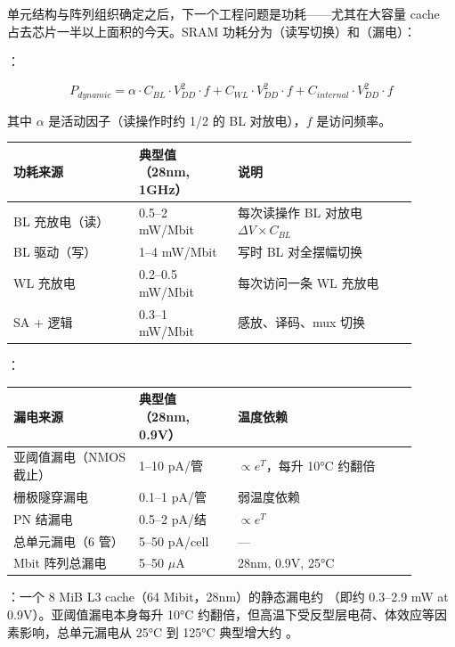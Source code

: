 
单元结构与阵列组织确定之后，下一个工程问题是功耗——尤其在大容量 cache 占去芯片一半以上面积的今天。SRAM 功耗分为（读写切换）和（漏电）：

：

$$P_{dynamic} = \alpha \cdot C_{BL} \cdot V_{DD}^2 \cdot f + C_{WL} \cdot V_{DD}^2 \cdot f + C_{internal} \cdot V_{DD}^2 \cdot f$$

其中 $\alpha$ 是活动因子（读操作时约 1/2 的 BL 对放电），$f$ 是访问频率。

\begin{longtable}{L{0.28\linewidth}L{0.22\linewidth}L{0.40\linewidth}}
\toprule
功耗来源 & 典型值（28nm, 1GHz） & 说明 \\
\midrule
BL 充放电（读） & 0.5--2 mW/Mbit & 每次读操作 BL 对放电 $\Delta V \times C_{BL}$ \\\tablerowrule
BL 驱动（写） & 1--4 mW/Mbit & 写时 BL 对全摆幅切换 \\\tablerowrule
WL 充放电 & 0.2--0.5 mW/Mbit & 每次访问一条 WL 充放电 \\\tablerowrule
SA + 逻辑 & 0.3--1 mW/Mbit & 感放、译码、mux 切换 \\
\bottomrule
\end{longtable}

：

\begin{longtable}{L{0.28\linewidth}L{0.22\linewidth}L{0.40\linewidth}}
\toprule
漏电来源 & 典型值（28nm, 0.9V） & 温度依赖 \\
\midrule
亚阈值漏电（NMOS 截止） & 1--10 pA/管 & $\propto e^{T}$，每升 10°C 约翻倍 \\\tablerowrule
栅极隧穿漏电 & 0.1--1 pA/管 & 弱温度依赖 \\\tablerowrule
PN 结漏电 & 0.5--2 pA/结 & $\propto e^{T}$ \\\tablerowrule
总单元漏电（6 管） & 5--50 pA/cell & — \\ Mbit 阵列总漏电 & 5--50 $\mu$A & 28nm, 0.9V, 25°C \\
\bottomrule
\end{longtable}

：一个 8 MiB L3 cache（64 Mibit，28nm）的静态漏电约 （即约 0.3--2.9 mW at 0.9V）。亚阈值漏电本身每升 10°C 约翻倍，但高温下受反型层电荷、体效应等因素影响，总单元漏电从 25°C 到 125°C 典型增大约 。

